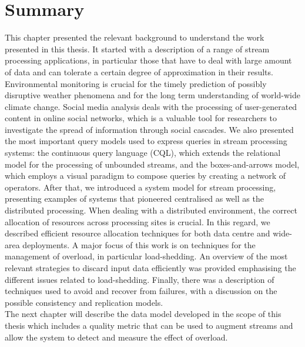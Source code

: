\section{Summary}

This chapter presented the relevant background to understand the work presented in this thesis.
It started with a description of a range of stream processing applications, in particular those that have
to deal with large amount of data and can tolerate a certain degree of approximation in their results.
Environmental monitoring is crucial for the timely prediction of possibly disruptive weather phenomena
and for the long term understanding of world-wide climate change. Social media analysis deals with the
processing of user-generated content in online social networks, which is a valuable tool for researchers
to investigate the spread of information through social cascades.
We also presented the most important query models used to express queries in stream processing systems:
the continuous query language (CQL), which extends the relational model for the processing of unbounded
streams, and the boxes-and-arrows model, which employs a visual paradigm to compose queries by creating a
network of operators.
After that, we introduced a system model for stream processing, presenting examples of systems that
pioneered centralised as well as the distributed processing. When dealing with a distributed environment,
the correct allocation of resources across processing sites is crucial. In this regard, we described
efficient resource allocation techniques for both data centre and wide-area deployments.
A major focus of this work is on techniques for the management of overload, in particular
\mbox{load-shedding}.
An overview of the most relevant strategies to discard input data efficiently was provided emphasising
the different issues related to \mbox{load-shedding}.
Finally, there was a description of techniques used to avoid and recover from failures, with a discussion
on the possible consistency and replication models.\\
The next chapter will describe the data model developed in the scope of this thesis which includes a
quality metric that can be used to augment streams and allow the system to detect and measure the effect
of overload. 
